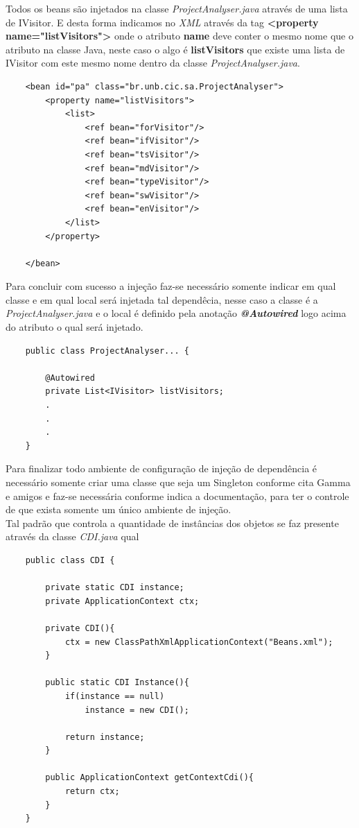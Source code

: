 Todos os beans são injetados na classe \textit{ProjectAnalyser.java} através de uma lista de IVisitor. E desta forma indicamos no \textit{XML} através da tag \textbf{<property name="listVisitors">} onde o atributo \textbf{name} deve conter o mesmo nome que o atributo na classe Java,  neste caso o algo é \textbf{listVisitors} que existe uma lista de IVisitor com este mesmo nome dentro da classe \textit{ProjectAnalyser.java}.\\
\begin{lstlisting}
	<bean id="pa" class="br.unb.cic.sa.ProjectAnalyser">
		<property name="listVisitors">
			<list>
				<ref bean="forVisitor"/>
				<ref bean="ifVisitor"/>
				<ref bean="tsVisitor"/>
				<ref bean="mdVisitor"/>
				<ref bean="typeVisitor"/>
				<ref bean="swVisitor"/>
				<ref bean="enVisitor"/>
			</list>
		</property>
	
	</bean>
\end{lstlisting}


Para concluir com sucesso a injeção faz-se necessário somente indicar em qual classe e em qual local será injetada tal dependêcia, nesse caso a classe é a \textit{ProjectAnalyser.java} e o local é definido pela anotação \textbf{\textit{@Autowired}} logo acima do atributo o qual será injetado.\\

\begin{lstlisting}
	public class ProjectAnalyser... {

		@Autowired
		private List<IVisitor> listVisitors;
		.
		.
		.
	}
\end{lstlisting}
\clearpage

Para finalizar todo ambiente de configuração de injeção de dependência é necessário somente criar uma classe que seja um Singleton\cite{Gamma:1995:DPE:186897} conforme cita Gamma e amigos e faz-se necessária conforme indica a documentação\cite{SPRING_REF}, para ter o controle de que exista somente um único ambiente de injeção.\\
Tal padrão que controla a quantidade de instâncias dos objetos se faz presente através da classe \textit{CDI.java} qual
\begin{lstlisting}
	public class CDI {
	
		private static CDI instance;
		private ApplicationContext ctx;
		
		private CDI(){ 
			ctx = new ClassPathXmlApplicationContext("Beans.xml");
		}
		
		public static CDI Instance(){
			if(instance == null)
				instance = new CDI();
		
			return instance;
		}
		
		public ApplicationContext getContextCdi(){
			return ctx;
		}
	}
\end{lstlisting}

